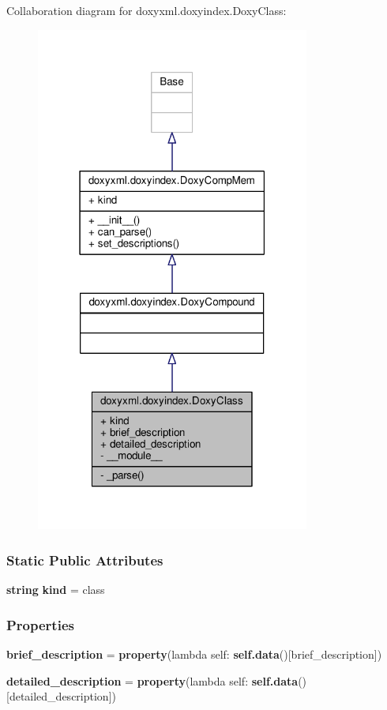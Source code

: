 Collaboration diagram for doxyxml.\+doxyindex.\+Doxy\+Class\+:
\nopagebreak
\begin{figure}[H]
\begin{center}
\leavevmode
\includegraphics[width=255pt]{d3/de1/classdoxyxml_1_1doxyindex_1_1DoxyClass__coll__graph}
\end{center}
\end{figure}
\subsubsection*{Static Public Attributes}
\begin{DoxyCompactItemize}
\item 
{\bf string} {\bf kind} = \textquotesingle{}class\textquotesingle{}
\end{DoxyCompactItemize}
\subsubsection*{Properties}
\begin{DoxyCompactItemize}
\item 
{\bf brief\+\_\+description} = {\bf property}(lambda self\+: {\bf self.\+data}()[\textquotesingle{}brief\+\_\+description\textquotesingle{}])
\item 
{\bf detailed\+\_\+description} = {\bf property}(lambda self\+: {\bf self.\+data}()[\textquotesingle{}detailed\+\_\+description\textquotesingle{}])
\end{DoxyCompactItemize}
